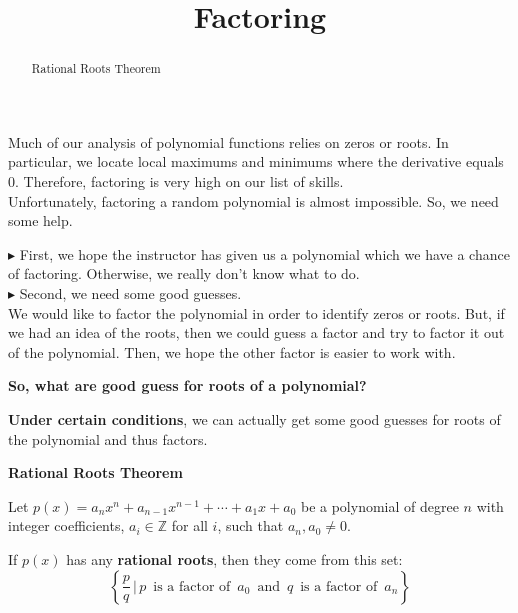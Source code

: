 \documentclass{ximera}
\title{Factoring}
\begin{document}
\begin{abstract}
Rational Roots Theorem
\end{abstract}
\maketitle




Much of our analysis of polynomial functions relies on zeros or roots. In particular, we locate local maximums and minimums where the derivative equals $0$.  Therefore, factoring is very high on our list of skills. \\

Unfortunately, factoring a random polynomial is almost impossible.  So, we need some help.


$\blacktriangleright$ First, we hope the instructor has given us a polynomial which we have a chance of factoring.  Otherwise, we really don't know what to do. \\




$\blacktriangleright$ Second, we need some good guesses. \\


We would like to factor the polynomial in order to identify zeros or roots.  But, if we had an idea of the roots, then we could guess a factor and try to factor it out of the polynomial. Then, we hope the other factor is easier to work with.\\

\begin{center}
\textbf{\textcolor{red!80!black}{So, what are good guess for roots of a polynomial?}}
\end{center}


\textbf{\textcolor{purple!85!blue}{Under certain conditions}}, we can actually get some good guesses for roots of the polynomial and thus factors.






\begin{theorem} \textbf{\textcolor{green!50!black}{Rational Roots Theorem}} 



Let $p(x) = a_n x^n + a_{n-1} x^{n-1} + \cdots + a_1 x + a_0$ be a polynomial of degree $n$ with integer coefficients, $a_i \in \mathbb{Z}$ for all $i$, such that $a_n, a_0 \ne 0$.

If $p(x)$ has any \textbf{rational roots}, then they come from this set: 
\[
\left\{ \frac{p}{q} \, | \, p \, \text{ is a factor of } \, a_0 \, \text{ and } \, q \, \text{ is a factor of } \, a_n  \right\}
\]



\end{theorem}
\end{document}
